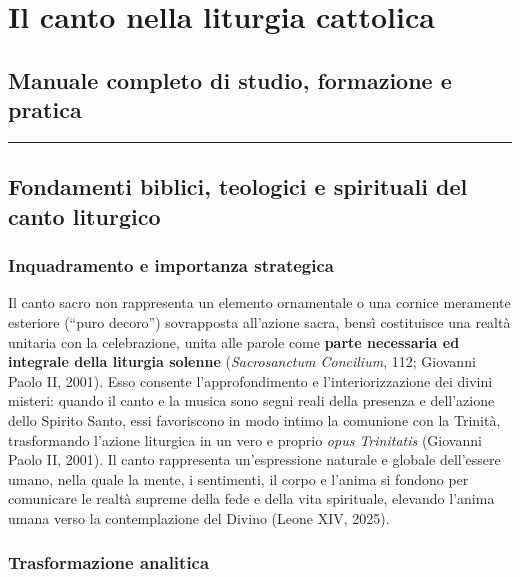 \documentclass[12pt,a4paper]{article}
\begin{document}
	
	\section{Il canto nella liturgia cattolica}\label{il-canto-nella-liturgia-cattolica}
	
	\subsection{Manuale completo di studio, formazione e pratica}\label{manuale-completo-di-studio-formazione-e-pratica}
	
	\begin{center}\rule{0.5\linewidth}{0.5pt}\end{center}
	
	\subsection{Fondamenti biblici, teologici e spirituali del canto liturgico}\label{fondamenti-biblici-teologici-e-spirituali-del-canto-liturgico}
	
	\subsubsection{Inquadramento e importanza strategica}\label{inquadramento-e-importanza-strategica}
	
	Il canto sacro non rappresenta un elemento ornamentale o una cornice meramente esteriore (``puro decoro'') sovrapposta all'azione sacra, bensì costituisce una realtà unitaria con la celebrazione, unita alle parole come \textbf{parte necessaria ed integrale della liturgia solenne} (\emph{Sacrosanctum Concilium}, 112; Giovanni Paolo II, 2001). Esso consente l'approfondimento e l'interiorizzazione dei divini misteri: quando il canto e la musica sono segni reali della presenza e dell'azione dello Spirito Santo, essi favoriscono in modo intimo la comunione con la Trinità, trasformando l'azione liturgica in un vero e proprio \emph{opus Trinitatis} (Giovanni Paolo II, 2001). Il canto rappresenta un'espressione naturale e globale dell'essere umano, nella quale la mente, i sentimenti, il corpo e l'anima si fondono per comunicare le realtà supreme della fede e della vita spirituale, elevando l'anima umana verso la contemplazione del Divino (Leone XIV, 2025).
	
	\subsubsection{Trasformazione analitica}\label{trasformazione-analitica}
	
\end{document}
